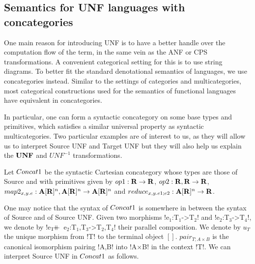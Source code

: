 \subsection{Semantics for UNF languages with concategories} %
\label{sub:Semantics for UNF using concategories}

One main reason for introducing UNF is to have a better handle over
the computation flow of the term, in the same vein as the ANF or CPS transformations.
A convenient categorical setting for this is to use string diagrams.
To better fit the standard denotational semantics of languages, 
we use concategories instead. Similar to the settings of categories and multicategories, 
most categorical constructions used for the semantics of functional languages 
have equivalent in concategories.

In particular, one can form a syntactic concategory on some base types and primitives, 
which satisfies a similar universal property as syntactic multicategories.
Two particular examples are of interest to us, as they will allow us to interpret Source UNF and Target UNF
but they will also help us explain the $\mathbf{UNF}$ and $UNF^{-1}$ transformations.

\begin{definition}[$\ConcatS$]
Let $\ConcatS$ be the syntactic Cartesian concategory whose types are those of Source and 
with primitives given by $op1: \mathbf{R} \to \mathbf{R}$, $op2: \mathbf{R},\mathbf{R} \to \mathbf{R}$, 
$map2_{x,y.e}: \mathbf{A}[\mathbf{R}]^{n},\mathbf{A}[\mathbf{R}]^{n}\to \mathbf{A}[\mathbf{R}]^{n}$ and $reduce_{x,y.e1;e2}:\mathbf{A}[\mathbf{R}]^{n}\to \mathbf{R}$.
\end{definition}

One may notice that the syntax of $\ConcatS$ is somewhere in between the syntax of Source and of Source UNF.
Given two morphisms !e$_1$:T$_1$->T$_2$! and !e$_2$:T$_3$->T$_4$!, we denote by !e$_1 \concatcomp$ e$_2$:T$_1$,T$_3$->T$_2$,T$_4$! 
their parallel composition.
We denote by $u_T$ the unique morphism from !T! to the terminal object $[]$.
$pair_{T;A\times B}$ is the canonical isomorphism pairing !A,B! into !A$\times$B! in the context !T!.
We can interpret Source UNF in $\ConcatS$ as follows.

